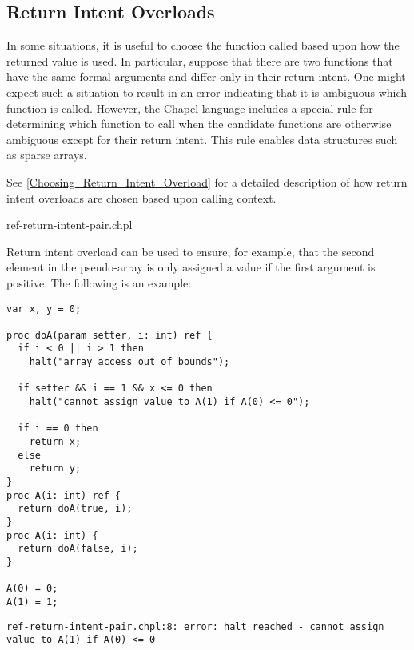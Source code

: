 \subsection{Return Intent Overloads}
\label{Return_Intent_Overloads}

In some situations, it is useful to choose the function called based upon
how the returned value is used.  In particular, suppose that there are
two functions that have the same formal arguments and differ only in
their return intent. One might expect such a situation to result in an
error indicating that it is ambiguous which function is called. However,
the Chapel language includes a special rule for determining which
function to call when the candidate functions are otherwise ambiguous
except for their return intent.  This rule enables data structures such
as sparse arrays.

See \ref{Choosing_Return_Intent_Overload} for a detailed description of
how return intent overloads are chosen based upon calling context.

\begin{chapelexample}{ref-return-intent-pair.chpl}

Return intent overload can be used to ensure, for
example, that the second element in the pseudo-array is only assigned
a value if the first argument is positive.  The following is an
example:
\begin{chapel}
\begin{verbatim}
var x, y = 0;

proc doA(param setter, i: int) ref {
  if i < 0 || i > 1 then
    halt("array access out of bounds");

  if setter && i == 1 && x <= 0 then
    halt("cannot assign value to A(1) if A(0) <= 0");

  if i == 0 then
    return x;
  else
    return y;
}
proc A(i: int) ref {
  return doA(true, i);
}
proc A(i: int) {
  return doA(false, i);
}

A(0) = 0;
A(1) = 1; 
\end{verbatim}
\end{chapel}
\begin{chapeloutput}
\begin{verbatim}
ref-return-intent-pair.chpl:8: error: halt reached - cannot assign value to A(1) if A(0) <= 0
\end{verbatim}
\end{chapeloutput}
\end{chapelexample}



